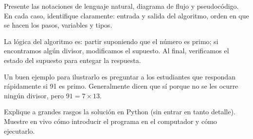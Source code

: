 \documentclass[10pt]{article}
\begin{document}

  Presente las notaciones de lenguaje natural,
  diagrama de flujo y pseudocódigo.
  En cada caso, identifique claramente:
  entrada y salida del algoritmo,
  orden en que se hacen los pasos,
  variables y tipos.

  La lógica del algoritmo es:
  partir suponiendo que el número es primo;
  si encontramos algún divisor,
  modificamos el supuesto.
  Al final, verificamos el estado del supuesto
  para entegar la respuesta.

  Un buen ejemplo para ilustrarlo
  es preguntar a los estudiantes que respondan rápidamente si 91 es primo.
  Generalmente dicen que sí porque no se les ocurre ningún divisor,
  pero \(91 = 7\times 13\).


  Explique a grandes rasgos la solución en Python
  (sin entrar en tanto detalle).
  Muestre en vivo
  cómo introducir el programa en el computador
  y cómo ejecutarlo.
\end{document}

